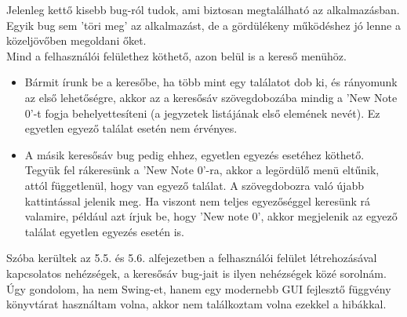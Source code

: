 Jelenleg kettő kisebb bug-ról tudok, ami biztosan megtalálható az alkalmazásban. Egyik bug sem 'töri meg' az alkalmazást, de a gördülékeny működéshez jó lenne a közeljövőben megoldani őket.
\\ Mind a felhasználói felülethez köthető, azon belül is a kereső menühöz.
\begin{itemize}
	\item Bármit írunk be a keresőbe, ha több mint egy találatot dob ki, és rányomunk az első lehetőségre, akkor az a keresősáv szövegdobozába mindig a 'New Note 0'-t fogja behelyettesíteni (a jegyzetek listájának első elemének nevét). Ez egyetlen egyező találat esetén nem érvényes.
	\item A másik keresősáv bug pedig ehhez, egyetlen egyezés esetéhez köthető. Tegyük fel rákeresünk a 'New Note 0'-ra, akkor a legördülő menü eltűnik, attól függetlenül, hogy van egyező találat. A szövegdobozra való újabb kattintással jelenik meg. Ha viszont nem teljes egyezőséggel keresünk rá valamire, például azt írjuk be, hogy 'New note 0', akkor megjelenik az egyező találat egyetlen egyezés esetén is.
\end{itemize}
\noindent Szóba kerültek az 5.5. és 5.6. alfejezetben a felhasználói felület létrehozásával kapcsolatos nehézségek, a keresősáv bug-jait is ilyen nehézségek közé sorolnám.
\\Úgy gondolom, ha nem Swing-et, hanem egy modernebb GUI fejlesztő függvény könyvtárat használtam volna, akkor nem találkoztam volna ezekkel a hibákkal.